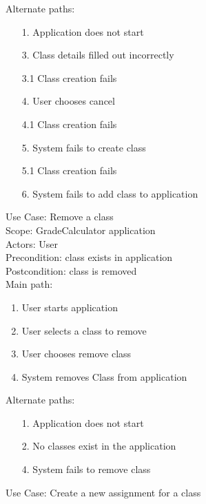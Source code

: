 \documentclass[12pt]{article}
\begin{document}
\noindent
Alternate paths:
\begin{enumerate}
	\item[1.] Application does not start
	\item[3.] Class details filled out incorrectly
	\item[3.1] Class creation fails
	\item[4.] User chooses cancel
	\item[4.1] Class creation fails 
	\item[5.] System fails to create class
	\item[5.1] Class creation fails
	\item[6.] System fails to add class to application
\end{enumerate}

\newpage

\noindent
Use Case: Remove a class \\

\noindent
Scope: GradeCalculator application \\

\noindent
Actors: User \\

\noindent
Precondition: class exists in application \\

\noindent
Postcondition: class is removed \\

\noindent
Main path:

\begin{enumerate}
	\item User starts application
	\item User selects a class to remove
	\item User chooses remove class
	\item System removes Class from application
\end{enumerate}

\noindent
Alternate paths:
\begin{enumerate}
	\item[1.] Application does not start
	\item[2.] No classes exist in the application
	\item[4.] System fails to remove class
\end{enumerate}

\newpage

\noindent
Use Case: Create a new assignment for a class \\
\end{document}
